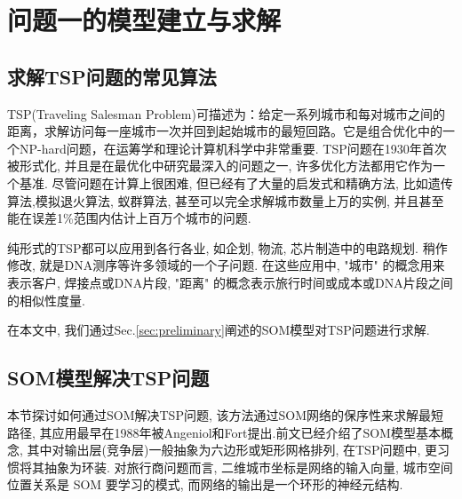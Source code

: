 


\section{问题一的模型建立与求解}
\label{sec:method1}

\subsection{求解TSP问题的常见算法}
TSP(Traveling Salesman Problem)可描述为：给定一系列城市和每对城市之间的距离，求解访问每一座城市一次并回到起始城市的最短回路。它是组合优化中的一个NP-hard问题，在运筹学和理论计算机科学中非常重要.
TSP问题在1930年首次被形式化, 并且是在最优化中研究最深入的问题之一, 许多优化方法都用它作为一个基准. 尽管问题在计算上很困难, 但已经有了大量的启发式和精确方法, 比如遗传算法\cite{geneticTSP},模拟退火算法\cite{SimulatedAnnealing}, 蚁群算法\cite{AntTSP}, 甚至可以完全求解城市数量上万的实例, 并且甚至能在误差1\%范围内估计上百万个城市的问题\cite{AdlemanTSP}.

纯形式的TSP都可以应用到各行各业, 如企划, 物流, 芯片制造中的电路规划. 稍作修改, 就是DNA测序等许多领域的一个子问题. 在这些应用中, "城市" 的概念用来表示客户, 焊接点或DNA片段, "距离" 的概念表示旅行时间或成本或DNA片段之间的相似性度量. 

在本文中, 我们通过Sec.\ref{sec:preliminary}阐述的SOM模型对TSP问题进行求解.



\subsection{SOM模型解决TSP问题}
本节探讨如何通过SOM解决TSP问题, 该方法通过SOM网络的保序性来求解最短路径, 其应用最早在1988年被Angeniol和Fort提出\cite{som-tsp}.前文已经介绍了SOM模型基本概念, 其中对输出层(竞争层)一般抽象为六边形或矩形网格排列, 在TSP问题中, 更习惯将其抽象为环装\cite{som-tsp}. 对旅行商问题而言, 二维城市坐标是网络的输入向量, 城市空间位置关系是 SOM 要学习的模式, 而网络的输出是一个环形的神经元结构.


